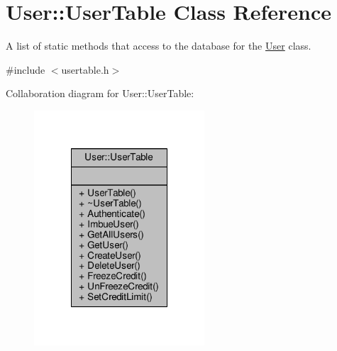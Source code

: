 \hypertarget{classUser_1_1UserTable}{\section{User\-:\-:User\-Table Class Reference}
\label{classUser_1_1UserTable}
}


A list of static methods that access to the database for the \hyperlink{classUser_1_1User}{User} class.  




{\ttfamily \#include $<$usertable.\-h$>$}



Collaboration diagram for User\-:\-:User\-Table\-:
\nopagebreak
\begin{figure}[H]
\begin{center}
\leavevmode
\includegraphics[width=180pt]{classUser_1_1UserTable__coll__graph}
\end{center}
\end{figure}
